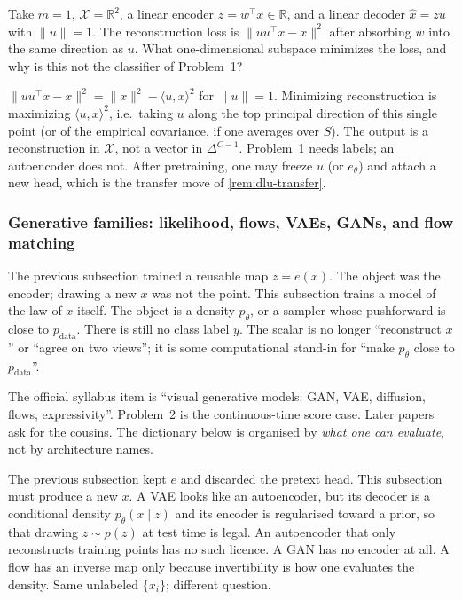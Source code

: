 \begin{exercise}
\label{ex:dlu-ae}
Take \(m=1\), \(\mathcal{X}=\mathbb{R}^2\), a linear encoder \(z=w^\top x\in\mathbb{R}\), and a linear decoder \(\widehat x=z u\) with \(\|u\|=1\). The reconstruction loss is \(\|uu^\top x-x\|^2\) after absorbing \(w\) into the same direction as \(u\). What one-dimensional subspace minimizes the loss, and why is this not the classifier of Problem~1?
\end{exercise}

\begin{solution}
\(\|uu^\top x-x\|^2=\|x\|^2-\langle u,x\rangle^2\) for \(\|u\|=1\). Minimizing reconstruction is maximizing \(\langle u,x\rangle^2\), i.e.\ taking \(u\) along the top principal direction of this single point (or of the empirical covariance, if one averages over \(S\)). The output is a reconstruction in \(\mathcal{X}\), not a vector in \(\Delta^{C-1}\). Problem~1 needs labels; an autoencoder does not. After pretraining, one may freeze \(u\) (or \(e_\theta\)) and attach a new head, which is the transfer move of \cref{rem:dlu-transfer}.
\end{solution}


\subsubsection{Generative families: likelihood, flows, VAEs, GANs, and flow matching}
\label{subsubsec:dlu-gen}

The previous subsection trained a reusable map \(z=e(x)\). The object was the encoder; drawing a new \(x\) was not the point. This subsection trains a model of the law of \(x\) itself. The object is a density \(p_\theta\), or a sampler whose pushforward is close to \(p_{\mathrm{data}}\). There is still no class label \(y\). The scalar is no longer ``reconstruct \(x\)'' or ``agree on two views''; it is some computational stand-in for ``make \(p_\theta\) close to \(p_{\mathrm{data}}\)''.

The official syllabus item is ``visual generative models: GAN, VAE, diffusion, flows, expressivity''. Problem~2 is the continuous-time score case. Later papers ask for the cousins. The dictionary below is organised by \emph{what one can evaluate}, not by architecture names.

\begin{remark}
\label{rem:dlu-gen-not-rep}
The previous subsection kept \(e\) and discarded the pretext head. This subsection must produce a new \(x\). A VAE looks like an autoencoder, but its decoder is a conditional density \(p_\theta(x\mid z)\) and its encoder is regularised toward a prior, so that drawing \(z\sim p(z)\) at test time is legal. An autoencoder that only reconstructs training points has no such licence. A GAN has no encoder at all. A flow has an inverse map only because invertibility is how one evaluates the density. Same unlabeled \(\{x_i\}\); different question.
\end{remark}

